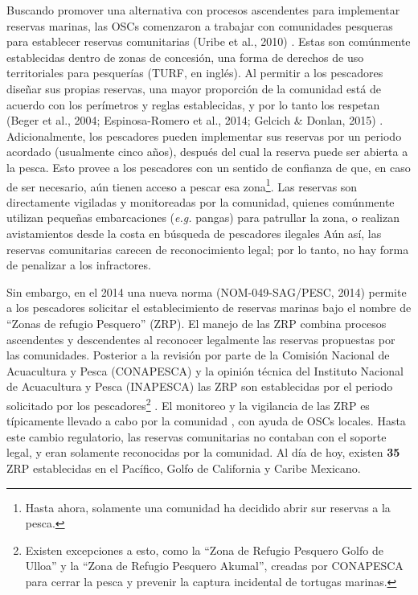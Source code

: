\documentclass[12pt,]{article}
\let\rmarkdownfootnote\footnote%
\def\footnote{\protect\rmarkdownfootnote}
\begin{document}
Buscando promover una alternativa con procesos ascendentes para
implementar reservas marinas, las OSCs comenzaron a trabajar con
comunidades pesqueras para establecer reservas comunitarias (Uribe et
al., 2010) . Estas son comúnmente establecidas dentro de zonas de
concesión, una forma de derechos de uso territoriales para pesquerías
(TURF, en inglés). Al permitir a los pescadores diseñar sus propias
reservas, una mayor proporción de la comunidad está de acuerdo con los
perímetros y reglas establecidas, y por lo tanto los respetan (Beger et
al., 2004; Espinosa-Romero et al., 2014; Gelcich \& Donlan, 2015) .
Adicionalmente, los pescadores pueden implementar sus reservas por un
periodo acordado (usualmente cinco años), después del cual la reserva
puede ser abierta a la pesca. Esto provee a los pescadores con un
sentido de confianza de que, en caso de ser necesario, aún tienen acceso
a pescar esa zona\footnote{Hasta ahora, solamente una comunidad ha
  decidido abrir sur reservas a la pesca.}. Las reservas son
directamente vigiladas y monitoreadas por la comunidad, quienes
comúnmente utilizan pequeñas embarcaciones (\emph{e.g.} pangas) para
patrullar la zona, o realizan avistamientos desde la costa en búsqueda
de pescadores ilegales Aún así, las reservas comunitarias carecen de
reconocimiento legal; por lo tanto, no hay forma de penalizar a los
infractores.

Sin embargo, en el 2014 una nueva norma (NOM-049-SAG/PESC, 2014) permite
a los pescadores solicitar el establecimiento de reservas marinas bajo
el nombre de ``Zonas de refugio Pesquero'' (ZRP). El manejo de las ZRP
combina procesos ascendentes y descendentes al reconocer legalmente las
reservas propuestas por las comunidades. Posterior a la revisión por
parte de la Comisión Nacional de Acuacultura y Pesca (CONAPESCA) y la
opinión técnica del Instituto Nacional de Acuacultura y Pesca (INAPESCA)
las ZRP son establecidas por el periodo solicitado por los
pescadores\footnote{Existen excepciones a esto, como la ``Zona de
  Refugio Pesquero Golfo de Ulloa'' y la ``Zona de Refugio Pesquero
  Akumal'', creadas por CONAPESCA para cerrar la pesca y prevenir la
  captura incidental de tortugas marinas.} . El monitoreo y la
vigilancia de las ZRP es típicamente llevado a cabo por la comunidad ,
con ayuda de OSCs locales. Hasta este cambio regulatorio, las reservas
comunitarias no contaban con el soporte legal, y eran solamente
reconocidas por la comunidad. Al día de hoy, existen \textbf{35} ZRP
establecidas en el Pacífico, Golfo de California y Caribe Mexicano.
\end{document}
